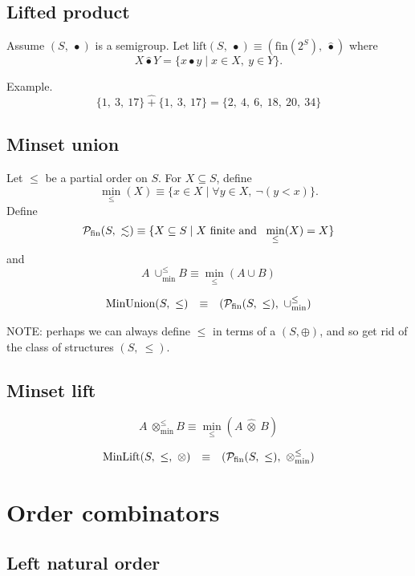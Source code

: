 \documentclass[10pt]{report}
\newcommand{\minunion}{\mathbin{\cup_{\min}^{\leq}}}
\newcommand{\minlift}{\mathbin{\otimes_{\min}^{\leq}}}
\begin{document}
\subsection{Lifted product} 

Assume $(S,\ \bullet)$ is a semigroup. 
Let 
$\mathrm{lift}(S,\ \bullet) \equiv (\mathrm{fin}(2^S),\ \hat{\bullet})$ where 
\[ 
X \hat{\bullet} Y  = \{x \bullet y \mid x\in X,\ y\in Y\}. 
\]

Example. 
\[
    \{1,\ 3,\ 17\}\ \hat{+}\ \{1,\ 3,\ 17\} = \{2,\ 4,\ 6,\ 18,\ 20,\ 34\} 
\] 

\subsection{Minset union} 

Let $\leq$ be a partial order on $S$. 
For $X \subseteq S$, define 
\[
\min_\leq(X) \equiv \{x \in X \mid \forall y \in X,\  \neg(y < x)\}. 
\] 
Define 
\[
{\cal P}_{\mathrm{fin}}(S,\ \lesssim) 
   \equiv 
\{X \subseteq S\mid \mbox{$X$ finite and \ }\min_\leq(X) = X\} 
\] 
and 
\[
  A\ \minunion B  \equiv  \min_\leq(A\cup B) 
\] 

\[ 
\begin{array}{rcl} 
\mathrm{MinUnion}(S,\ \leq)
   & \equiv 
   & ({\cal P}_{\mathrm{fin}}(S,\ \leq),\ \minunion)
\end{array} 
\] 


NOTE: perhaps we can always define $\leq$ in terms of a $(S,\oplus)$, and so 
get rid of the class of structures $(S,\ \leq)$. 

\subsection{Minset lift} 

\[
  A\ \minlift B  \equiv   \min_\leq(A \ \hat{\otimes} \ B)
\] 

\[ 
\begin{array}{rcl} 
\mathrm{MinLift}(S,\ \leq,\ \otimes)
   & \equiv 
   & ({\cal P}_{\mathrm{fin}}(S,\ \leq),\ \minlift)
\end{array} 
\]

\section{Order combinators}

\subsection{Left natural order}
\end{document}
